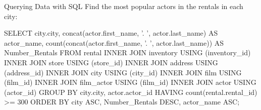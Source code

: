 \documentclass[ignorenonframetext,xcolor=x11names]{beamer}
\begin{document}
\begin{frame}[fragile]{Querying Data with SQL}
Find the most popular actors in the rentals in each city:
\footnotesize
\begin{sqlcode}
SELECT city.city, 
       concat(actor.first_name, '. ', 
           actor.last_name) AS actor_name,
       count(concat(actor.first_name, '. ', 
           actor.last_name)) AS Number_Rentals
  FROM rental
  INNER JOIN inventory USING (inventory_id)
  INNER JOIN store USING (store_id)
  INNER JOIN address USING (address_id)
  INNER JOIN city USING (city_id)
  INNER JOIN film USING (film_id)
  INNER JOIN film_actor USING (film_id)
  INNER JOIN actor USING (actor_id)
  GROUP BY city.city, actor.actor_id
  HAVING count(rental.rental_id) >= 300
  ORDER BY city ASC, 
           Number_Rentals DESC, 
           actor_name ASC;
\end{sqlcode}
\end{frame}
\end{document}
